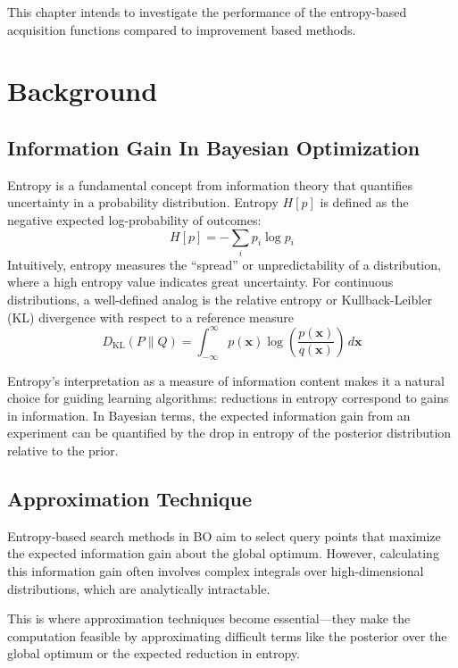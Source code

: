 \documentclass{ut-thesis}
\begin{document}
This chapter intends to investigate the performance of the entropy-based acquisition functions compared to improvement based methods.

\section{Background}

\subsection{Information Gain In Bayesian Optimization}
Entropy is a fundamental concept from information theory that quantifies uncertainty in a probability distribution. Entropy $H[p]$ 
is defined as the negative expected log-probability of outcomes\cite{6773024}:
\begin{equation}
    H[p] = -\sum_i p_i \log p_i
\end{equation}
Intuitively, entropy measures the “spread” or unpredictability of a distribution, where a high entropy value indicates great uncertainty. For continuous distributions, a well-defined analog is the relative entropy or Kullback-Leibler (KL) divergence with respect to a reference measure\cite{kullback1968information}
\begin{equation}
    D_{\mathrm{KL}}(P \| Q) = \int_{-\infty}^{\infty} p(\mathbf{x}) \log \left( \frac{p(\mathbf{x})}{q(\mathbf{x})} \right) \, d\mathbf{x}
\end{equation}

Entropy’s interpretation as a measure of information content makes it a natural choice for guiding learning algorithms: reductions in entropy correspond to gains in information. In Bayesian terms, the expected information gain from an experiment can be quantified by the drop in entropy of the posterior distribution relative to the prior.


\subsection{Approximation Technique}
Entropy-based search methods in BO aim to select query points that maximize the expected information gain about the global optimum. However, calculating this information gain often involves complex integrals over high-dimensional distributions, which are analytically intractable. 

This is where approximation techniques become essential—they make the computation feasible by approximating difficult terms like the posterior over the global optimum or the expected reduction in entropy. 
\end{document}
